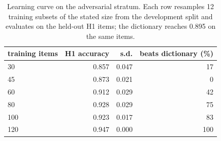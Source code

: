 \begin{table}[t]
\centering\small
\begin{tabular}{lrrr}
\toprule
training items & H1 accuracy & s.d. & beats dictionary (\%) \\
\midrule
30 & 0.857 & 0.047 & 17 \\
45 & 0.873 & 0.021 & 0 \\
60 & 0.912 & 0.029 & 42 \\
80 & 0.928 & 0.029 & 75 \\
100 & 0.923 & 0.017 & 83 \\
120 & 0.947 & 0.000 & 100 \\
\bottomrule
\end{tabular}
\caption{Learning curve on the adversarial stratum. Each row resamples 12 training subsets of the stated size from the development split and evaluates on the held-out H1 items; the dictionary reaches 0.895 on the same items.}
\label{tab:lc}
\end{table}
